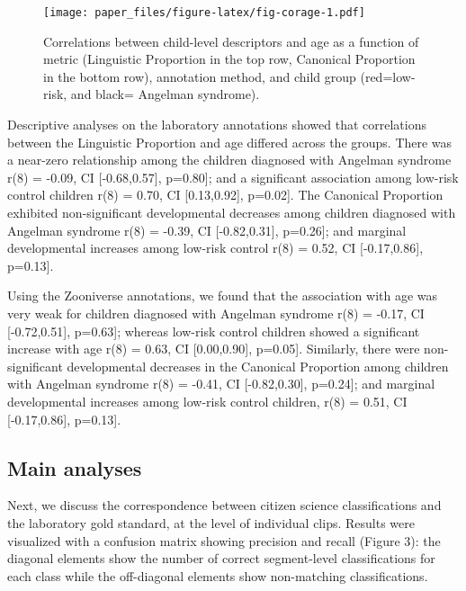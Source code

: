 \documentclass[english,,man,floatsintext]{apa6}
\begin{document}
\begin{figure}
\centering
\texttt{[image: paper\_files/figure-latex/fig-corage-1.pdf]}
\caption{\label{fig:fig-corage}Correlations between child-level descriptors and age as a function of metric (Linguistic Proportion in the top row, Canonical Proportion in the bottom row), annotation method, and child group (red=low-risk, and black= Angelman syndrome).}
\end{figure}

Descriptive analyses on the laboratory annotations showed that correlations between the Linguistic Proportion and age differed across the groups. There was a near-zero relationship among the children diagnosed with Angelman syndrome r(8) = -0.09, CI {[}-0.68,0.57{]}, p=0.80{]}; and a significant association among low-risk control children r(8) = 0.70, CI {[}0.13,0.92{]}, p=0.02{]}. The Canonical Proportion exhibited non-significant developmental decreases among children diagnosed with Angelman syndrome r(8) = -0.39, CI {[}-0.82,0.31{]}, p=0.26{]}; and marginal developmental increases among low-risk control r(8) = 0.52, CI {[}-0.17,0.86{]}, p=0.13{]}.

Using the Zooniverse annotations, we found that the association with age was very weak for children diagnosed with Angelman syndrome r(8) = -0.17, CI {[}-0.72,0.51{]}, p=0.63{]}; whereas low-risk control children showed a significant increase with age r(8) = 0.63, CI {[}0.00,0.90{]}, p=0.05{]}. Similarly, there were non-significant developmental decreases in the Canonical Proportion among children with Angelman syndrome r(8) = -0.41, CI {[}-0.82,0.30{]}, p=0.24{]}; and marginal developmental increases among low-risk control children, r(8) = 0.51, CI {[}-0.17,0.86{]}, p=0.13{]}.

\hypertarget{main-analyses}{%
\subsection{Main analyses}\label{main-analyses}}

Next, we discuss the correspondence between citizen science classifications and the laboratory gold standard, at the level of individual clips. Results were visualized with a confusion matrix showing precision and recall (Figure 3): the diagonal elements show the number of correct segment-level classifications for each class while the off-diagonal elements show non-matching classifications.
\end{document}
